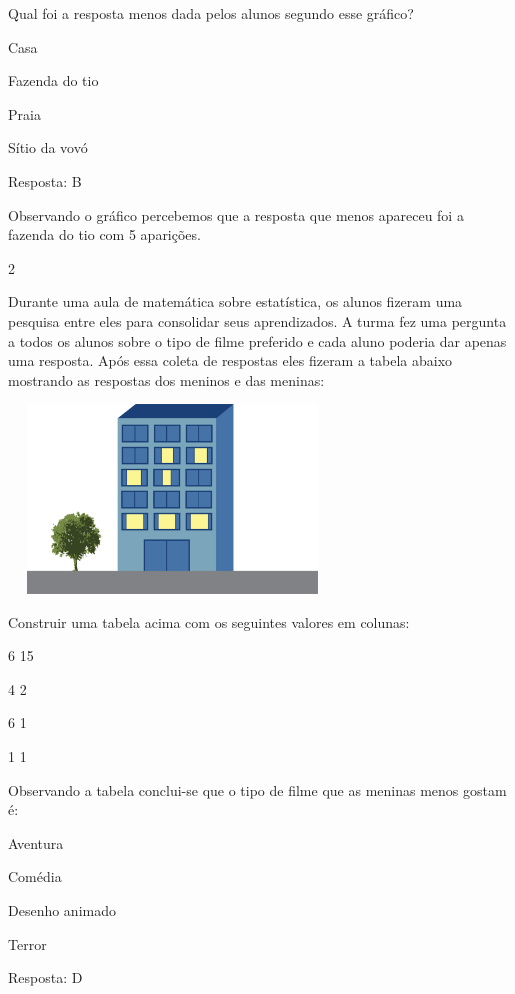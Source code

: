\begin{escolha}
Qual foi a resposta menos dada pelos alunos segundo esse gráfico?

\begin{escolha}
\item
  Casa
\item
  Fazenda do tio
\item
  Praia
\item
  Sítio da vovó
\end{escolha}

Resposta: B

Observando o gráfico percebemos que a resposta que menos apareceu foi a
fazenda do tio com 5 aparições.

\num{2}

Durante uma aula de matemática sobre estatística, os alunos fizeram uma
pesquisa entre eles para consolidar seus aprendizados. A turma fez uma
pergunta a todos os alunos sobre o tipo de filme preferido e cada aluno
poderia dar apenas uma resposta. Após essa coleta de respostas eles
fizeram a tabela abaixo mostrando as respostas dos meninos e das
meninas:

\includegraphics[width=3.42308in,height=1.97646in]{media/image93.png}

Construir uma tabela acima com os seguintes valores em colunas:

6 15

4 2

6 1

1 1

Observando a tabela conclui-se que o tipo de filme que as meninas menos
gostam é:

\begin{escolha}

\item
  Aventura
\item
  Comédia
\item
  Desenho animado
\item
  Terror
\end{escolha}

Resposta: D


\end{escolha}
